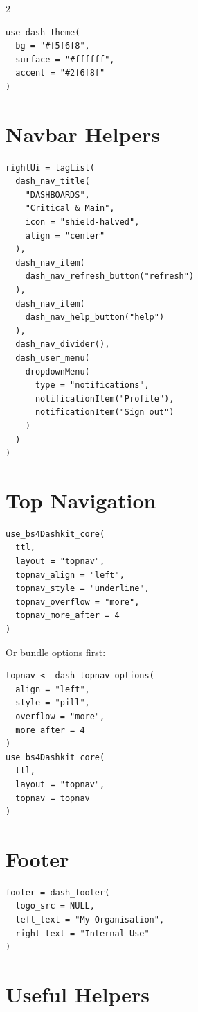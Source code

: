 \documentclass[10pt]{article}
\begin{document}
\begin{multicols}{2}
\begin{lstlisting}[style=rstyle]
use_dash_theme(
  bg = "#f5f6f8",
  surface = "#ffffff",
  accent = "#2f6f8f"
)
\end{lstlisting}

\section*{Navbar Helpers}

\begin{lstlisting}[style=rstyle]
rightUi = tagList(
  dash_nav_title(
    "DASHBOARDS",
    "Critical & Main",
    icon = "shield-halved",
    align = "center"
  ),
  dash_nav_item(
    dash_nav_refresh_button("refresh")
  ),
  dash_nav_item(
    dash_nav_help_button("help")
  ),
  dash_nav_divider(),
  dash_user_menu(
    dropdownMenu(
      type = "notifications",
      notificationItem("Profile"),
      notificationItem("Sign out")
    )
  )
)
\end{lstlisting}

\section*{Top Navigation}

\begin{lstlisting}[style=rstyle]
use_bs4Dashkit_core(
  ttl,
  layout = "topnav",
  topnav_align = "left",
  topnav_style = "underline",
  topnav_overflow = "more",
  topnav_more_after = 4
)
\end{lstlisting}

Or bundle options first:

\begin{lstlisting}[style=rstyle]
topnav <- dash_topnav_options(
  align = "left",
  style = "pill",
  overflow = "more",
  more_after = 4
)
use_bs4Dashkit_core(
  ttl,
  layout = "topnav",
  topnav = topnav
)
\end{lstlisting}

\section*{Footer}

\begin{lstlisting}[style=rstyle]
footer = dash_footer(
  logo_src = NULL,
  left_text = "My Organisation",
  right_text = "Internal Use"
)
\end{lstlisting}

\section*{Useful Helpers}


\end{multicols}
\end{document}
